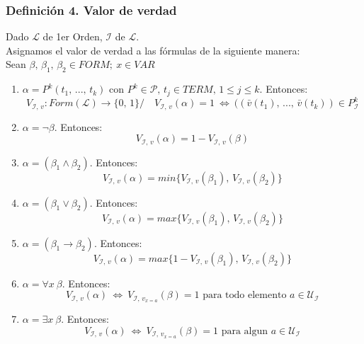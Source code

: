 \documentclass{article}
\newcommand{\comma}{,\,}                                %
\newcommand{\tq}{/\,}                                   %
\newcommand{\partes}{\mathcal{P}}
\newcommand{\lenguaje}{\mathcal{L}}
\newcommand{\interpretacion}{\mathcal{I}}
\newcommand{\universo}{\mathcal{U}}
\newcommand{\Leftrightarrows}{\: \Leftrightarrow \:}    %
\begin{document}
\subsubsection*{Definición 4. Valor de verdad}
Dado $\lenguaje$ de 1er Orden, $\interpretacion$ de $\lenguaje$. 
\\Asignamos el valor de verdad a las fórmulas de la siguiente manera:
\\Sean $\beta \comma \beta_1 \comma \beta_2 \in FORM;\: x \in VAR$
\begin{enumerate}
    \item $\alpha = P^k(t_1 \comma ... \comma t_k)$ con $P^k \in \partes \comma t_j \in TERM \comma 1 \leq j \leq k$. Entonces:
    \begin{equation*}
        V_{\interpretacion \comma v}: Form(\lenguaje) \rightarrow \{0 \comma 1\} \tq \;\;\; V_{\interpretacion \comma v}(\alpha) = 1 \Leftrightarrows ((\bar{v}(t_1) \comma ... \comma \bar{v}(t_k)) \in P^k_\interpretacion
    \end{equation*}
    \item $\alpha = \neg \beta$. Entonces:
    \begin{equation*}
        V_{\interpretacion \comma v}(\alpha) = 1 - V_{\interpretacion \comma v}(\beta)
    \end{equation*}
    \item $\alpha = (\beta_1 \wedge \beta_2)$. Entonces:
    \begin{equation*}
        V_{\interpretacion \comma v}(\alpha) = min\{V_{\interpretacion \comma v}(\beta_1) \comma V_{\interpretacion \comma v}(\beta_2)\}
    \end{equation*}
    \item $\alpha = (\beta_1 \vee \beta_2)$. Entonces:
    \begin{equation*}
        V_{\interpretacion \comma v}(\alpha) = max\{V_{\interpretacion \comma v}(\beta_1) \comma V_{\interpretacion \comma v}(\beta_2)\}
    \end{equation*}
    \item $\alpha = (\beta_1 \rightarrow \beta_2)$. Entonces:
    \begin{equation*}
        V_{\interpretacion \comma v}(\alpha) = max\{1 - V_{\interpretacion \comma v}(\beta_1) \comma V_{\interpretacion \comma v}(\beta_2)\}
    \end{equation*}
    \item $\alpha = \forall x \: \beta$. Entonces:
    \begin{equation*}
        V_{\interpretacion \comma v}(\alpha) \Leftrightarrows V_{\interpretacion \comma v_{x=a}}(\beta) = 1 \text{ para todo elemento } a \in \universo_\interpretacion
    \end{equation*}
    \item $\alpha = \exists x \: \beta$. Entonces:
    \begin{equation*}
        V_{\interpretacion \comma v}(\alpha) \Leftrightarrows V_{\interpretacion \comma v_{x=a}}(\beta) = 1 \text{ para algun } a \in \universo_\interpretacion
    \end{equation*}
\end{enumerate}
\end{document}
